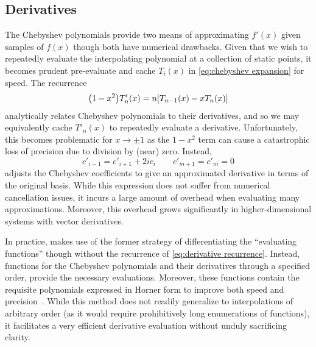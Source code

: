\subsection{Derivatives}
The Chebyshev polynomials provide two means of approximating $f'(x)$ given samples of $f(x)$ though both have numerical drawbacks.
Given that we wish to repeatedly evaluate the interpolating polynomial at a collection of static points, it becomes prudent pre-evaluate and cache $T_i(x)$ in \cref{eq:chebyshev expansion} for speed.
The recurrence
\begin{equation}
  \qty(1 - x^2) T_n'(x) = n \qty[T_{n-1}(x) - x T_n(x)]
  \label{eq:derivative recurrence}
\end{equation}
analytically relates Chebyshev polynomials to their derivatives, and so we may equivalently cache $T'_n(x)$ to repeatedly evaluate a derivative.
Unfortunately, this becomes problematic for $x \to \pm 1$ as the $1-x^2$ term can cause a catastrophic loss of precision due to division by (near) zero.
Instead,
\begin{equation}
  c'_{i-1} = c'_{i+1} + 2 i c_i \qquad c'_{m+1} = c'_m = 0
\end{equation}
adjusts the Chebyshev coefficients to give an approximated derivative in terms of the original basis.
While this expression does not suffer from numerical cancellation issues, it incurs a large amount of overhead when evaluating many approximations.
Moreover, this overhead grows significantly in higher-dimensional systems with vector derivatives.

In practice, \QuEST{} makes use of the former strategy of differentiating the ``evaluating functions'' though without the recurrence of \cref{eq:derivative recurrence}.
Instead, functions for the Chebyshev polynomials and their derivatives through a specified order, provide the necessary evaluations.
Moreover, these functions contain the requisite polynomials expressed in Horner form to improve both speed and precision~\cite{}.
While this method does not readily generalize to interpolations of arbitrary order (as it would require prohibitively long enumerations of functions), it facilitates a very efficient derivative evaluation without unduly sacrificing clarity.

